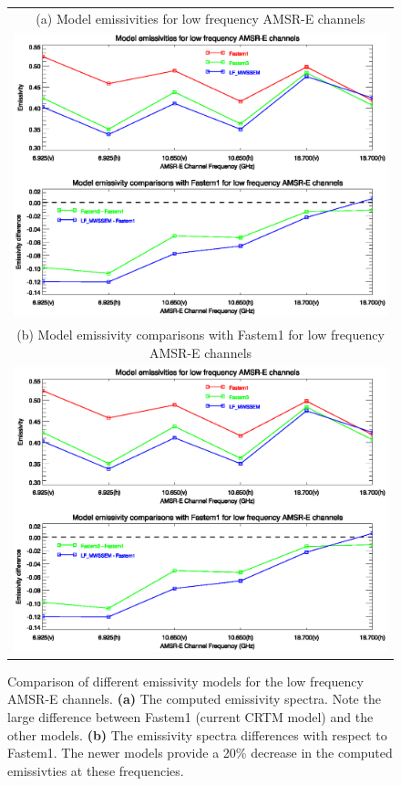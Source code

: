 \begin{figure}[htp]
  \centering
  \begin{tabular}{c}
    \textsf{(a) Model emissivities for low frequency AMSR-E channels}\\
    \includegraphics[bb=85 411 540 556,clip,scale=0.8]{graphics/Comparison/AMSR-E_Model_Comparison.eps}\\
    \textsf{(b) Model emissivity comparisons with Fastem1 for low frequency AMSR-E channels}\\
    \includegraphics[bb=85 225 540 380,clip,scale=0.8]{graphics/Comparison/AMSR-E_Model_Comparison.eps}
  \end{tabular}
  \caption{Comparison of different emissivity models for the low frequency AMSR-E channels. \textbf{(a)} The computed emissivity spectra. Note the large difference between Fastem1 (current CRTM model) and the other models. \textbf{(b)} The emissivity spectra differences with respect to Fastem1. The newer models provide a 20\% decrease in the computed emissivties at these frequencies.}
  \label{fig:AMSR-E_Model_Comparison}
\end{figure}

